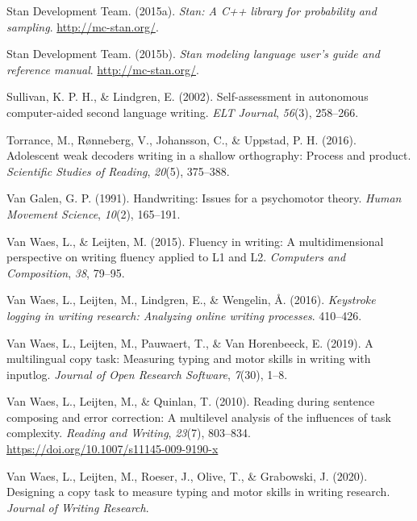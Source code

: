 \documentclass[
  english,
  man,mask,floatsintext]{apa7}
\newlength{\cslhangindent}
\newenvironment{cslreferences}%
  {\setlength{\parindent}{0pt}%
  \everypar{\setlength{\hangindent}{\cslhangindent}}\ignorespaces}%
  {\par}
\begin{document}
\begin{cslreferences}
\leavevmode\hypertarget{ref-rstan}{}%
Stan Development Team. (2015a). \emph{Stan: A C++ library for probability and sampling}. \url{http://mc-stan.org/}.

\leavevmode\hypertarget{ref-rstan2}{}%
Stan Development Team. (2015b). \emph{Stan modeling language user's guide and reference manual}. \url{http://mc-stan.org/}.

\leavevmode\hypertarget{ref-sullivan2002self}{}%
Sullivan, K. P. H., \& Lindgren, E. (2002). Self-assessment in autonomous computer-aided second language writing. \emph{ELT Journal}, \emph{56}(3), 258--266.

\leavevmode\hypertarget{ref-torrance2016adolescent}{}%
Torrance, M., Rønneberg, V., Johansson, C., \& Uppstad, P. H. (2016). Adolescent weak decoders writing in a shallow orthography: Process and product. \emph{Scientific Studies of Reading}, \emph{20}(5), 375--388.

\leavevmode\hypertarget{ref-van1991handwriting}{}%
Van Galen, G. P. (1991). Handwriting: Issues for a psychomotor theory. \emph{Human Movement Science}, \emph{10}(2), 165--191.

\leavevmode\hypertarget{ref-van2015fluency}{}%
Van Waes, L., \& Leijten, M. (2015). Fluency in writing: A multidimensional perspective on writing fluency applied to L1 and L2. \emph{Computers and Composition}, \emph{38}, 79--95.

\leavevmode\hypertarget{ref-van2016keystroke}{}%
Van Waes, L., Leijten, M., Lindgren, E., \& Wengelin, Å. (2016). \emph{Keystroke logging in writing research: Analyzing online writing processes}. 410--426.

\leavevmode\hypertarget{ref-van2019multilingual}{}%
Van Waes, L., Leijten, M., Pauwaert, T., \& Van Horenbeeck, E. (2019). A multilingual copy task: Measuring typing and motor skills in writing with inputlog. \emph{Journal of Open Research Software}, \emph{7}(30), 1--8.

\leavevmode\hypertarget{ref-van2010reading}{}%
Van Waes, L., Leijten, M., \& Quinlan, T. (2010). Reading during sentence composing and error correction: A multilevel analysis of the influences of task complexity. \emph{Reading and Writing}, \emph{23}(7), 803--834. \url{https://doi.org/10.1007/s11145-009-9190-x}

\leavevmode\hypertarget{ref-waes2019}{}%
Van Waes, L., Leijten, M., Roeser, J., Olive, T., \& Grabowski, J. (2020). Designing a copy task to measure typing and motor skills in writing research. \emph{Journal of Writing Research}.


\end{cslreferences}
\end{document}
